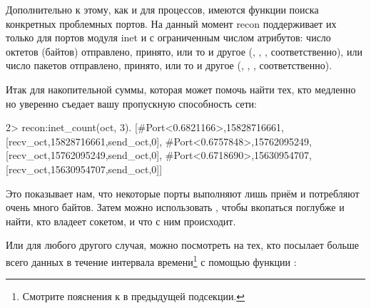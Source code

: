 Дополнительно к этому, как и для процессов, имеются функции поиска конкретных проблемных портов. На данный момент recon поддерживает их только для портов модуля inet и с ограниченным числом атрибутов: число октетов (байтов) отправлено, принято, или то и другое (, , , соответственно), или число пакетов отправлено, принято, или то и другое (, , , соответственно).

Итак для накопительной суммы, которая может помочь найти тех, кто медленно но уверенно съедает вашу пропускную способность сети:

\begin{VerbatimEshell}
2> recon:inet_count(oct, 3).
[{#Port<0.6821166>,15828716661,
  [{recv_oct,15828716661},{send_oct,0}]},
 {#Port<0.6757848>,15762095249,
  [{recv_oct,15762095249},{send_oct,0}]},
 {#Port<0.6718690>,15630954707,
  [{recv_oct,15630954707},{send_oct,0}]}]
\end{VerbatimEshell}

Это показывает нам, что некоторые порты выполняют лишь приём и потребляют очень много байтов. Затем можно использовать , чтобы вкопаться поглубже и найти, кто владеет сокетом, и что с ним происходит.

Или для любого другого случая, можно посмотреть на тех, кто посылает больше всего данных в течение интервала времени\footnote{Смотрите пояснения к  в предыдущей подсекции.} с помощью функции :

